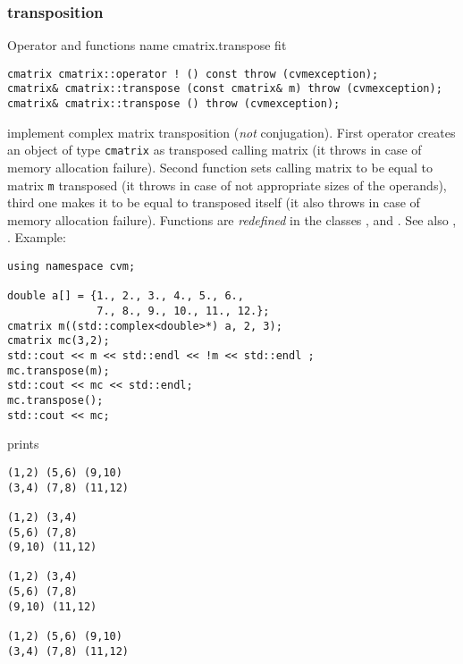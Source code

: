 \subsubsection{transposition}
Operator and functions%
\pdfdest name {cmatrix.transpose} fit
\begin{verbatim}
cmatrix cmatrix::operator ! () const throw (cvmexception);
cmatrix& cmatrix::transpose (const cmatrix& m) throw (cvmexception);
cmatrix& cmatrix::transpose () throw (cvmexception);
\end{verbatim}
implement complex matrix transposition (\emph{not} conjugation).
First operator creates an object of type \verb"cmatrix" as
transposed calling matrix
(it throws  
in case of memory allocation failure). 
Second function sets  calling matrix to be equal to  matrix
\verb"m" transposed
(it throws  
in case of not appropriate sizes of the operands), 
third one makes it to be equal to
transposed itself (it also throws  
in case of memory allocation failure). 
Functions are \emph{redefined} in the classes
,  
and .
See also , .
Example:
\begin{Verbatim}
using namespace cvm;

double a[] = {1., 2., 3., 4., 5., 6.,
              7., 8., 9., 10., 11., 12.};
cmatrix m((std::complex<double>*) a, 2, 3);
cmatrix mc(3,2);
std::cout << m << std::endl << !m << std::endl ;
mc.transpose(m);
std::cout << mc << std::endl;
mc.transpose();
std::cout << mc;
\end{Verbatim}
prints
\begin{Verbatim}
(1,2) (5,6) (9,10)
(3,4) (7,8) (11,12)

(1,2) (3,4)
(5,6) (7,8)
(9,10) (11,12)

(1,2) (3,4)
(5,6) (7,8)
(9,10) (11,12)

(1,2) (5,6) (9,10)
(3,4) (7,8) (11,12)
\end{Verbatim}
\newpage













